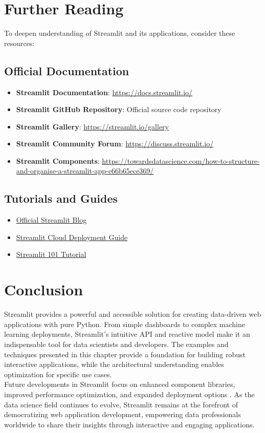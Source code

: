 \section{Further Reading}
\label{sec:further_reading}

To deepen understanding of Streamlit and its applications, consider these resources:

\subsection{Official Documentation}
\begin{itemize}
	\item \textbf{Streamlit Documentation}: \url{https://docs.streamlit.io/}
	\item \textbf{Streamlit GitHub Repository}: Official source code repository \cite{Streamlit:2024}
	\item \textbf{Streamlit Gallery}: \url{https://streamlit.io/gallery}
	\item \textbf{Streamlit Community Forum}: \url{https://discuss.streamlit.io/}
	\item \textbf{Streamlit Components}: \url{https://towardsdatascience.com/how-to-structure-and-organise-a-streamlit-app-e66b65ece369/}
\end{itemize}

\subsection{Tutorials and Guides}
\begin{itemize}
	\item \href{https://blog.streamlit.io/}{Official Streamlit Blog}
	\item \href{https://streamlit.io/cloud}{Streamlit Cloud Deployment Guide}
	\item \href{https://towardsdatascience.com/beginners-guide-to-streamlit-for-deploying-your-data-science-projects-9c9fce488831/}{Streamlit 101 Tutorial} \cite{Towards:2023}
\end{itemize}

\section{Conclusion}
\label{sec:conclusion}

Streamlit provides a powerful and accessible solution for creating data-driven web applications with pure Python. From simple dashboards to complex machine learning deployments, Streamlit's intuitive API and reactive model make it an indispensable tool for data scientists and developers. The examples and techniques presented in this chapter provide a foundation for building robust interactive applications, while the architectural understanding enables optimization for specific use cases.\\

Future developments in Streamlit focus on enhanced component libraries, improved performance optimization, and expanded deployment options \cite{Chen:2023}. As the data science field continues to evolve, Streamlit remains at the forefront of democratizing web application development, empowering data professionals worldwide to share their insights through interactive and engaging applications.